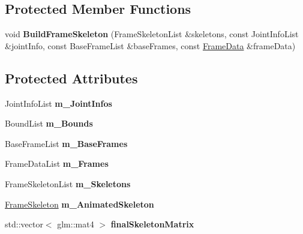 \subsection*{Protected Member Functions}
\begin{DoxyCompactItemize}
\item 
void {\bfseries Build\+Frame\+Skeleton} (Frame\+Skeleton\+List \&skeletons, const Joint\+Info\+List \&joint\+Info, const Base\+Frame\+List \&base\+Frames, const \hyperlink{struct_m_d5_animation_1_1_frame_data}{Frame\+Data} \&frame\+Data)\hypertarget{class_m_d5_animation_a0cff7f3ae566479937fa3935cdceff1a}{}\label{class_m_d5_animation_a0cff7f3ae566479937fa3935cdceff1a}

\end{DoxyCompactItemize}
\subsection*{Protected Attributes}
\begin{DoxyCompactItemize}
\item 
Joint\+Info\+List {\bfseries m\+\_\+\+Joint\+Infos}\hypertarget{class_m_d5_animation_a534dbc471789e8068f1fe7b2612d0473}{}\label{class_m_d5_animation_a534dbc471789e8068f1fe7b2612d0473}

\item 
Bound\+List {\bfseries m\+\_\+\+Bounds}\hypertarget{class_m_d5_animation_a563bead578187d904bcb05865a589a04}{}\label{class_m_d5_animation_a563bead578187d904bcb05865a589a04}

\item 
Base\+Frame\+List {\bfseries m\+\_\+\+Base\+Frames}\hypertarget{class_m_d5_animation_a63c8b797cfb34b237ef07c70cf57c042}{}\label{class_m_d5_animation_a63c8b797cfb34b237ef07c70cf57c042}

\item 
Frame\+Data\+List {\bfseries m\+\_\+\+Frames}\hypertarget{class_m_d5_animation_a6279a8f164832a31430c5c27a630c176}{}\label{class_m_d5_animation_a6279a8f164832a31430c5c27a630c176}

\item 
Frame\+Skeleton\+List {\bfseries m\+\_\+\+Skeletons}\hypertarget{class_m_d5_animation_a8f697d5eb44ede098e2c8da70f8bb3db}{}\label{class_m_d5_animation_a8f697d5eb44ede098e2c8da70f8bb3db}

\item 
\hyperlink{struct_m_d5_animation_1_1_frame_skeleton}{Frame\+Skeleton} {\bfseries m\+\_\+\+Animated\+Skeleton}\hypertarget{class_m_d5_animation_aa2089bc95c2ad6b30113989c49d305fd}{}\label{class_m_d5_animation_aa2089bc95c2ad6b30113989c49d305fd}

\item 
std\+::vector$<$ glm\+::mat4 $>$ {\bfseries final\+Skeleton\+Matrix}\hypertarget{class_m_d5_animation_a87b07f5e10f3bac5bab316e23b734704}{}\label{class_m_d5_animation_a87b07f5e10f3bac5bab316e23b734704}

\end{DoxyCompactItemize}

